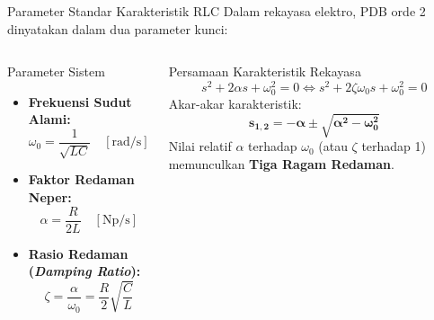 \documentclass[aspectratio=169,10pt]{beamer}
\begin{document}
\begin{frame}{Parameter Standar Karakteristik RLC}
  Dalam rekayasa elektro, PDB orde 2 dinyatakan dalam dua parameter kunci:
  \vspace{0.1cm}
  \begin{columns}[t]
    \begin{block}{Parameter Sistem}
      \begin{itemize}
        \item \textbf{Frekuensi Sudut Alami:}
        \begin{equation*}
          \omega_0 = \frac{1}{\sqrt{LC}} \quad [\text{rad/s}]
        \end{equation*}
        \item \textbf{Faktor Redaman Neper:}
        \begin{equation*}
          \alpha = \frac{R}{2L} \quad [\text{Np/s}]
        \end{equation*}
        \item \textbf{Rasio Redaman (\textit{Damping Ratio}):}
        \begin{equation*}
          \zeta = \frac{\alpha}{\omega_0} = \frac{R}{2} \sqrt{\frac{C}{L}}
        \end{equation*}
      \end{itemize}
    \end{block}

    \begin{exampleblock}{Persamaan Karakteristik Rekayasa}
      \begin{equation*}
        s^2 + 2\alpha s + \omega_0^2 = 0 \iff s^2 + 2\zeta\omega_0 s + \omega_0^2 = 0
      \end{equation*}
      Akar-akar karakteristik:
      \begin{equation*}
        \mathbf{s_{1,2} = -\alpha \pm \sqrt{\alpha^2 - \omega_0^2}}
      \end{equation*}
      Nilai relatif $\alpha$ terhadap $\omega_0$ (atau $\zeta$ terhadap 1) memunculkan \textbf{Tiga Ragam Redaman}.
    \end{exampleblock}
  \end{columns}
\end{frame}
\end{document}
